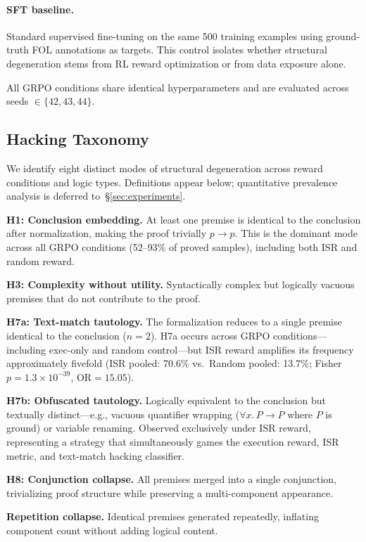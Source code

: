 \paragraph{SFT baseline.}
Standard supervised fine-tuning on the same 500 training examples using ground-truth FOL annotations as targets.
This control isolates whether structural degeneration stems from RL reward optimization or from data exposure alone.

All GRPO conditions share identical hyperparameters and are evaluated across seeds $\in \{42, 43, 44\}$.

\subsection{Hacking Taxonomy}
\label{sec:taxonomy}

We identify eight distinct modes of structural degeneration across reward conditions and logic types.
Definitions appear below; quantitative prevalence analysis is deferred to~\S\ref{sec:experiments}.

\textbf{H1: Conclusion embedding.}
At least one premise is identical to the conclusion after normalization, making the proof trivially $p \rightarrow p$.
This is the dominant mode across all GRPO conditions (52--93\% of proved samples), including both ISR and random reward.

\textbf{H3: Complexity without utility.}
Syntactically complex but logically vacuous premises that do not contribute to the proof.

\textbf{H7a: Text-match tautology.}
The formalization reduces to a single premise identical to the conclusion ($n{=}2$).
H7a occurs across GRPO conditions---including exec-only and random control---but ISR reward amplifies its frequency approximately fivefold (ISR pooled: 70.6\% vs.\ Random pooled: 13.7\%; Fisher $p = 1.3 \times 10^{-39}$, OR$= 15.05$).

\textbf{H7b: Obfuscated tautology.}
Logically equivalent to the conclusion but textually distinct---e.g., vacuous quantifier wrapping ($\forall x.\, P \rightarrow P$ where $P$ is ground) or variable renaming.
Observed exclusively under ISR reward, representing a strategy that simultaneously games the execution reward, ISR metric, and text-match hacking classifier.

\textbf{H8: Conjunction collapse.}
All premises merged into a single conjunction, trivializing proof structure while preserving a multi-component appearance.

\textbf{Repetition collapse.}
Identical premises generated repeatedly, inflating component count without adding logical content.

